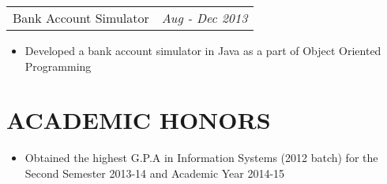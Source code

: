 \documentclass[margin]{res}
\begin{document}
\begin{resume}
                 \begin{tabular}{p{4.2in} r} %
                  Bank Account Simulator &  \textit{Aug - Dec 2013}
                 \end{tabular}
                  \begin{itemize}					        
                   \item[] Developed a bank account simulator in Java as a part of Object Oriented \\Programming 
                  \end{itemize}
                  
 

                  

\section{ACADEMIC HONORS} 
			\begin{itemize}
			
				  \item[] Obtained the highest G.P.A in Information Systems (2012 batch) for the Second Semester 2013-14 and Academic Year 2014-15
                  \end{itemize}
			   	

\end{resume}
\end{document}
